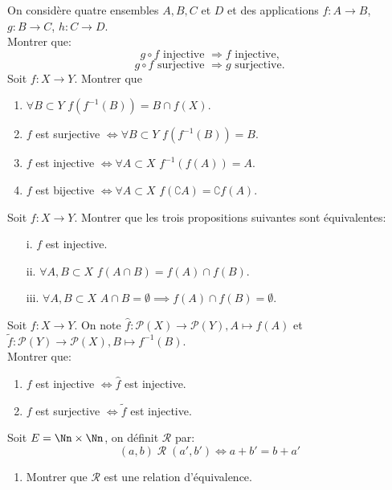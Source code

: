 \documentclass[10pt, a4paper, twocolumn]{homework}
\begin{document}
On consid\`ere quatre ensembles $A,B,C$ et $D$ et des applications $f:A\rightarrow B$, $g:B\rightarrow
C$, $h:C\rightarrow D$.\\
Montrer que:
$$g\circ f\text{ injective } \Rightarrow f\text{ injective,}$$
$$g\circ f\text{ surjective } \Rightarrow g\text{ surjective.}$$
Soit $f : X \rightarrow Y$. Montrer que
\begin{enumerate}
\item $\forall B \subset Y \, \, f (f^{-1} (B)) = B \cap f (X)$.
\item $f$ est surjective $\iff \forall B \subset Y \, \, f (f^{-1} (B)) = B $.
\item $f$ est injective $\iff \forall A \subset X \, \, f^{-1} (f(A)) = A $.
\item $f$ est bijective $\iff \forall A \subset X \, \,f (\complement A) = \complement f (A).$
\end{enumerate}
Soit $f : X \rightarrow Y$. Montrer que les trois propositions suivantes sont
\'equivalentes:
\begin{enumerate}
\item[i. ] $f$ est injective.
\item[ii. ] $\forall A, B \subset X \, \, f (A \cap B) = f (A) \cap f (B)$.
\item[iii. ]$\forall A, B \subset X \, \, A \cap B = \emptyset \implies
f (A) \cap f (B) = \emptyset$.
\end{enumerate}
Soit $f : X \rightarrow Y$. On note ${\hat{f}} : {\mathcal{P} (X)} \to {\mathcal{P} (Y)},
{A} \mapsto {f (A)}$ et ${\tilde{f}} : {\mathcal{P} (Y)} \to {\mathcal{P} (X)},
{B} \mapsto {f^{-1} (B)}$.\\

Montrer que:
\begin{enumerate}
\item $f$ est injective $\iff \hat{f}$ est injective.
\item $f$ est surjective $\iff \tilde{f}$ est injective.
\end{enumerate}
Soit $E=\Nn\times\Nn$, on d\'efinit $\mathcal{R}$ par:\\

$$(a,b)\;\mathcal{R}\;(a',b')\iff a+b'=b+a'$$
\begin{enumerate}
  \item Montrer que $\mathcal{R}$ est une relation d'équivalence.
\end{enumerate}
\end{document}
